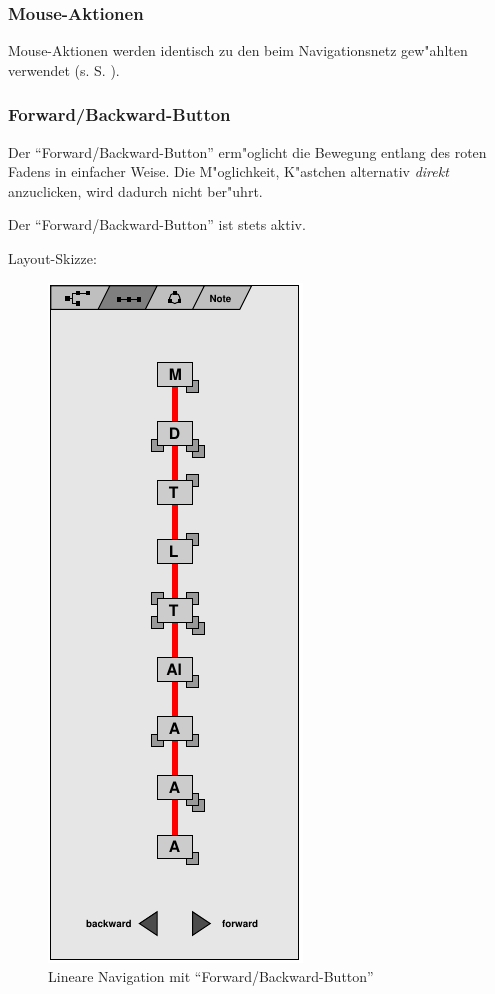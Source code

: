 \clearpage

\subsubsection{Mouse-Aktionen}

Mouse-Aktionen werden identisch zu den beim Navigationsnetz gew"ahlten
verwendet (s. S. \pageref{netz:mouse_actions}).

\subsubsection{Forward/Backward-Button}\label{}

Der ``Forward/Backward-Button'' erm"oglicht die Bewegung entlang des
roten Fadens in einfacher Weise.  Die M"oglichkeit, K"astchen
alternativ \textit{direkt} anzuclicken, wird dadurch nicht ber"uhrt.

Der ``Forward/Backward-Button'' ist stets aktiv.

Layout-Skizze:

\begin{figure}[h]
\begin{center}
\ifx\pdfoutput\undefined
\else
  \includegraphics{Skizzen/linear_komplett.pdf}
\fi
\caption{Lineare Navigation mit ``Forward/Backward-Button''}
\end{center}
\end{figure}


